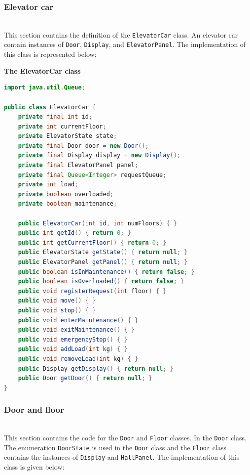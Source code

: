 \subsubsection{Elevator car}\label{_FM1DBRLxFVNgQAcR3p2f-1}
\\
This section contains the definition of the \texttt{ElevatorCar} class. An elevator car contain instances of \texttt{Door}, \texttt{Display}, and \texttt{ElevatorPanel}. The implementation of this class is represented below:

\textbf{The ElevatorCar class}

\begin{lstlisting}[language=Java]
import java.util.Queue;

public class ElevatorCar {
    private final int id;
    private int currentFloor;
    private ElevatorState state;
    private final Door door = new Door();
    private final Display display = new Display();
    private final ElevatorPanel panel;
    private final Queue<Integer> requestQueue;
    private int load;
    private boolean overloaded;
    private boolean maintenance;

    public ElevatorCar(int id, int numFloors) { }
    public int getId() { return 0; }
    public int getCurrentFloor() { return 0; }
    public ElevatorState getState() { return null; }
    public ElevatorPanel getPanel() { return null; }
    public boolean isInMaintenance() { return false; }
    public boolean isOverloaded() { return false; }
    public void registerRequest(int floor) { }
    public void move() { }
    public void stop() { }
    public void enterMaintenance() { }
    public void exitMaintenance() { }
    public void emergencyStop() { }
    public void addLoad(int kg) { }
    public void removeLoad(int kg) { }
    public Display getDisplay() { return null; }
    public Door getDoor() { return null; }
}

\end{lstlisting}

\subsubsection{Door and floor}\label{SRSE9ivjxp87WdBSivLc7}
\\
This section contains the code for the \texttt{Door} and \texttt{Floor} classes. In the \texttt{Door} class. The enumeration \texttt{DoorState} is used in the \texttt{Door} class and the \texttt{Floor} class contains the instances of \texttt{Display} and \texttt{HallPanel}. The implementation of this class is given below:

